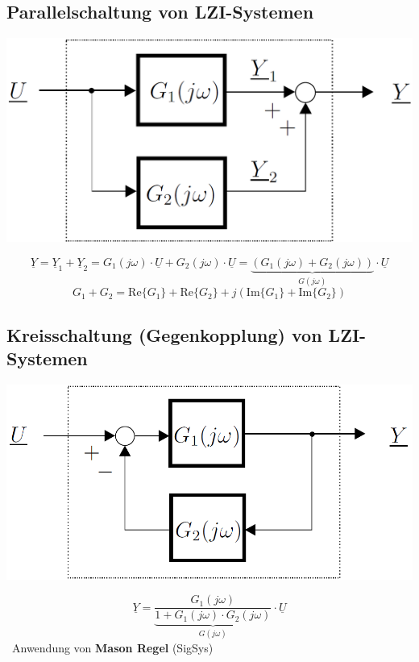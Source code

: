 \subsection{Parallelschaltung von LZI-Systemen}

\begin{center}
    \includegraphics[width=0.5\columnwidth]{images/frequenzgang_parallelschaltung.png}
\end{center}
$$ \boxed{ \underline{Y} = \underline{Y}_1 + \underline{Y}_2 = G_1(j \omega) \cdot \underline{U} + G_2(j \omega) \cdot \underline{U} 
    = \underbrace{(G_1(j \omega) + G_2(j \omega))}_{G(j \omega)} \cdot \underline{U}} $$
$$ G_1 + G_2 = \mathrm{Re}\{ G_1 \} + \mathrm{Re}\{ G_2 \} + j ( \mathrm{Im}\{ G_1 \} + \mathrm{Im}\{ G_2 \}) $$


\subsection{Kreisschaltung (Gegenkopplung) von LZI-Systemen}

\begin{minipage}[c]{0.5\columnwidth}
    \includegraphics[width=\columnwidth]{images/frequenzgang_kreisschaltung.png}
\end{minipage}
\hfill
\begin{minipage}[c]{0.48\columnwidth}
    $$ \boxed{ \underline{Y} = \underbrace{\frac{G_1(j \omega)}{1 + G_1(j \omega) \cdot G_2(j \omega)}}_{G(j \omega)} \cdot \underline{U}} $$
    \textrightarrow\ Anwendung von \textbf{Mason Regel} (SigSys)
\end{minipage}


